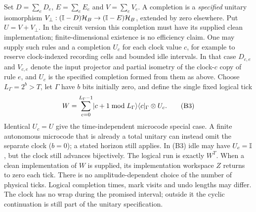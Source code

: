 \begin{definition}\label{def:tB-tick}
Set $D=\sum_eD_e$, $E=\sum_eE_e$ and $V=\sum_eV_e$.
A completion is a \emph{specified} unitary isomorphism
$V_\perp:(\mathbb{I}-D)\mathcal H_B\to(\mathbb{I}-E)\mathcal H_B$,
extended by zero elsewhere. Put $U=V+V_\perp$.
In the circuit version this completion must have its supplied clean
implementation; finite-dimensional existence is no efficiency claim.
One may supply such rules and a completion $U_c$ for each clock value
$c$, for example to reserve clock-indexed recording cells and bounded
idle intervals.
In that case $D_{c,e}$ and $V_{c,e}$ denote the input projector and
partial isometry of the clock-$c$ copy of rule $e$, and $U_c$ is the
specified completion formed from them as above.
Choose $L_{\Gamma}=2^b>T$, let $\Gamma$ have $b$ bits initially
zero, and define the single fixed logical tick
\[
 W=\sum_{c=0}^{L_{\Gamma}-1}\lvert c+1\bmod L_{\Gamma}\rangle\langle c\rvert_\Gamma\otimes U_c.
                                                               \tag{B3}
\]
Identical $U_c=U$ give the time-independent microcode special case.
A finite autonomous microcode that is already a total unitary can
instead omit the separate clock ($b=0$); a stated horizon still applies.
In (B3) idle may have $U_c=\mathbb{I}$, but the clock still advances bijectively.
The logical run is exactly $W^T$. When a clean implementation of $W$
is supplied, its implementation workspace $Z$ returns to zero each tick.
There is no amplitude-dependent choice of the number of physical ticks.
Logical completion times, mark visits and undo lengths may differ.
The clock has no wrap during the promised interval; outside it the
cyclic continuation is still part of the unitary specification.
\end{definition}

